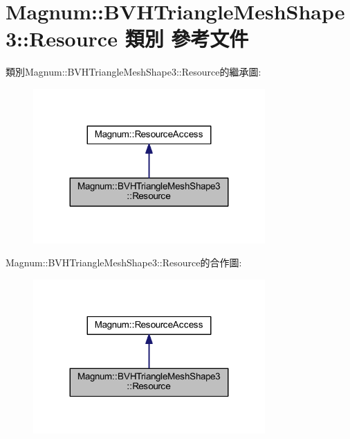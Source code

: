 \hypertarget{class_magnum_1_1_b_v_h_triangle_mesh_shape3_1_1_resource}{}\section{Magnum\+:\+:B\+V\+H\+Triangle\+Mesh\+Shape3\+:\+:Resource 類別 參考文件}
\label{class_magnum_1_1_b_v_h_triangle_mesh_shape3_1_1_resource}


類別\+Magnum\+:\+:B\+V\+H\+Triangle\+Mesh\+Shape3\+:\+:Resource的繼承圖\+:\nopagebreak
\begin{figure}[H]
\begin{center}
\leavevmode
\includegraphics[width=251pt]{class_magnum_1_1_b_v_h_triangle_mesh_shape3_1_1_resource__inherit__graph}
\end{center}
\end{figure}


Magnum\+:\+:B\+V\+H\+Triangle\+Mesh\+Shape3\+:\+:Resource的合作圖\+:\nopagebreak
\begin{figure}[H]
\begin{center}
\leavevmode
\includegraphics[width=251pt]{class_magnum_1_1_b_v_h_triangle_mesh_shape3_1_1_resource__coll__graph}
\end{center}
\end{figure}
